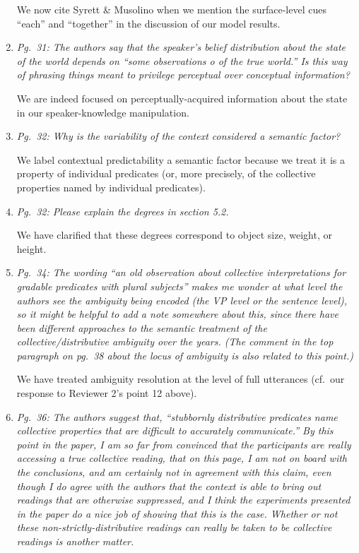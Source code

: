 \documentclass[12pt]{article}
\begin{document}
\begin{enumerate}
We now cite Syrett \& Musolino when we mention the surface-level cues ``each'' and ``together'' in the discussion of our model results.

\item \emph{Pg.~31: The authors say that the speaker's belief distribution about the state of the world depends on ``some observations o of the true world.'' Is this way of phrasing things meant to privilege perceptual over conceptual information?}

We are indeed focused on perceptually-acquired information about the state in our speaker-knowledge manipulation.

\item \emph{Pg.~32: Why is the variability of the context considered a semantic factor?} 

We label contextual predictability a semantic factor because we treat it is a property of individual predicates (or, more precisely, of the collective properties named by individual predicates).

\item \emph{Pg.~32: Please explain the degrees in section 5.2.}

We have clarified that these degrees correspond to object size, weight, or height.

\item \emph{Pg.~34: The wording ``an old observation about collective interpretations for gradable predicates with plural subjects'' makes me wonder at what level the authors see the ambiguity being encoded (the VP level or the sentence level), so it might be helpful to add a note somewhere about this, since there have been different approaches to the semantic treatment of the collective/distributive ambiguity over the years. (The comment in the top paragraph on pg.~38 about the locus of ambiguity is also related to this point.)}

We have treated ambiguity resolution at the level of full utterances (cf.~our response to Reviewer 2's point 12 above).

\item \emph{Pg.~36: The authors suggest that, ``stubbornly distributive predicates name collective properties that are difficult to accurately communicate.'' By this point in the paper, I am so far from convinced that the participants are really accessing a true collective reading, that on this page, I am not on board with the conclusions, and am certainly not in agreement with this claim, even though I do agree with the authors that the context is able to bring out readings that are otherwise suppressed, and I think the experiments presented in the paper do a nice job of showing that this is the case. Whether or not these non-strictly-distributive readings can really be taken to be collective readings is another matter.}


\end{enumerate}
\end{document}
